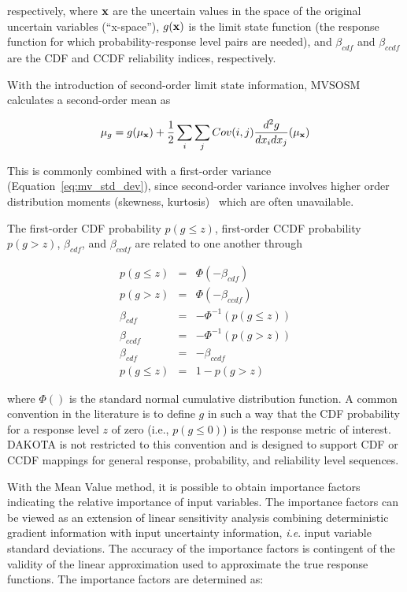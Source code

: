 respectively, where ${\bf x}$ are the uncertain values in the 
space of the original uncertain variables (``x-space''), $g({\bf x})$
is the limit state function (the response function for which
probability-response level pairs are needed), and $\beta_{cdf}$ and
$\beta_{ccdf}$ are the CDF and CCDF reliability indices, respectively.

With the introduction of second-order limit state information, MVSOSM
calculates a second-order mean as

\begin{equation}
\mu_g = g(\mu_{\bf x}) + \frac{1}{2} \sum_i \sum_j Cov(i,j) 
\frac{d^2g}{dx_i dx_j}(\mu_{\bf x}) \label{eq:mv_mean2}
\end{equation}

This is commonly combined with a first-order variance
(Equation~\ref{eq:mv_std_dev}), since second-order variance involves
higher order distribution moments (skewness, kurtosis)~\cite{Hal00}
which are often unavailable.

The first-order CDF probability $p(g \le z)$, first-order 
CCDF probability $p(g > z)$, $\beta_{cdf}$, and $\beta_{ccdf}$ are
related to one another through

\begin{eqnarray}
p(g \le z)   & = & \Phi(-\beta_{cdf})     \label{eq:p_cdf} \\
p(g > z)     & = & \Phi(-\beta_{ccdf})    \label{eq:p_ccdf} \\
\beta_{cdf}  & = & -\Phi^{-1}(p(g \le z)) \label{eq:beta_cdf} \\
\beta_{ccdf} & = & -\Phi^{-1}(p(g > z))   \label{eq:beta_ccdf} \\
\beta_{cdf}  & = & -\beta_{ccdf}          \label{eq:beta_cdf_ccdf} \\
p(g \le z)   & = & 1 - p(g > z)           \label{eq:p_cdf_ccdf}
\end{eqnarray}

where $\Phi()$ is the standard normal cumulative distribution
function.  A common convention in the literature is to define $g$ in
such a way that the CDF probability for a response level $z$ of zero
(i.e., $p(g \le 0)$) is the response metric of interest.  DAKOTA is
not restricted to this convention and is designed to support CDF or
CCDF mappings for general response, probability, and reliability level
sequences.

With the Mean Value method, it is possible to obtain 
importance factors indicating the relative importance of 
input variables.  The importance factors can be viewed
as an extension of linear sensitivity analysis combining deterministic
gradient information with input uncertainty information,
\emph{i.e}. input variable standard deviations. The accuracy of the
importance factors is contingent of the validity of the linear
approximation used to approximate the true response functions.
The importance factors are determined as: 


